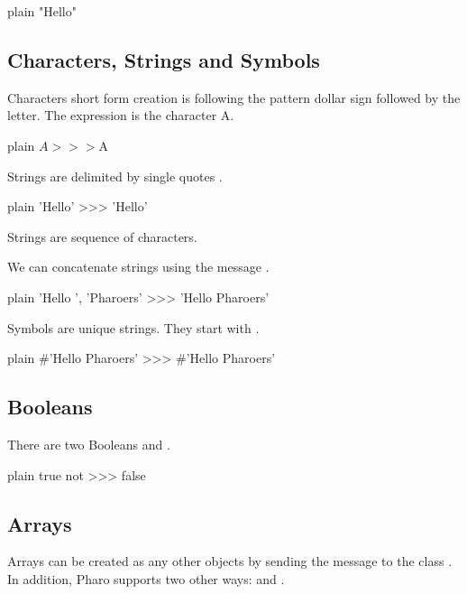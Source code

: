 \documentclass[10pt,twoside,english]{_support/latex/sbabook/sbabook}
\begin{document}
\begin{displaycode}{plain}
"Hello"
\end{displaycode}
\subsection{Characters, Strings and Symbols}
Characters short form creation is following the pattern dollar sign followed by the letter.  The expression  is the character A.

\begin{displaycode}{plain}
$A
>>> $A
\end{displaycode}

Strings are delimited by single quotes .

\begin{displaycode}{plain}
'Hello'
>>> 'Hello'
\end{displaycode}

Strings are sequence of characters.


We can concatenate strings using the message \textcode{,}.

\begin{displaycode}{plain}
'Hello ', 'Pharoers'
>>> 'Hello Pharoers'
\end{displaycode}

Symbols are unique strings. They start with \textcode{\#}.

\begin{displaycode}{plain}
#'Hello Pharoers'
>>> #'Hello Pharoers'
\end{displaycode}
\subsection{Booleans}
There are two Booleans  and . 

\begin{displaycode}{plain}
true not
>>> false
\end{displaycode}
\subsection{Arrays}
Arrays can be created as any other objects by sending the message  to the class .
In addition, Pharo supports two other ways: \textcode{\#( )} and . 
\end{document}
